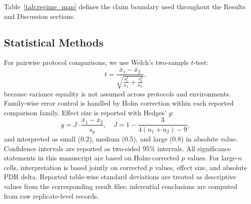 ﻿\documentclass[sensors,article,submit,moreauthors,pdftex]{Definitions/mdpi}
\begin{document}
\begin{table}[H]
\caption{Evidence-regime map used in this manuscript.}
\label{tab:regime_map}
\centering
{}
\end{table}

Table~\ref{tab:regime_map} defines the claim boundary used throughout the Results and Discussion sections.

\subsection{Statistical Methods}
For pairwise protocol comparisons, we use Welch's two-sample $t$-test:
\begin{equation}
t=\frac{\bar{x}_1-\bar{x}_2}{\sqrt{\frac{s_1^2}{n_1}+\frac{s_2^2}{n_2}}},
\end{equation}
because variance equality is not assumed across protocols and environments. Family-wise error control is handled by Holm correction within each reported comparison family. Effect size is reported with Hedges' $g$:
\begin{equation}
g = J\cdot\frac{\bar{x}_1-\bar{x}_2}{s_p},\quad
J=1-\frac{3}{4(n_1+n_2)-9},
\end{equation}
and interpreted as small (0.2), medium (0.5), and large (0.8) in absolute value. Confidence intervals are reported as two-sided 95\% intervals. All significance statements in this manuscript are based on Holm-corrected $p$ values. For large-$n$ cells, interpretation is based jointly on corrected $p$ values, effect size, and absolute PDR delta. Reported table-wise standard deviations are treated as descriptive values from the corresponding result files; inferential conclusions are computed from raw replicate-level records.
\end{document}
